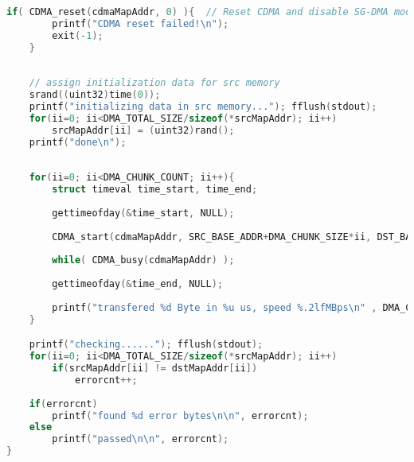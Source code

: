 \begin{lstlisting}[language=c, label=lst:sh, caption={Codice completo test CDMA}]
    if( CDMA_reset(cdmaMapAddr, 0) ){  // Reset CDMA and disable SG-DMA mode
        printf("CDMA reset failed!\n");
        exit(-1);
    }
    
    
    // assign initialization data for src memory
    srand((uint32)time(0));
    printf("initializing data in src memory..."); fflush(stdout);
    for(ii=0; ii<DMA_TOTAL_SIZE/sizeof(*srcMapAddr); ii++)
        srcMapAddr[ii] = (uint32)rand();
    printf("done\n");
    
    
    for(ii=0; ii<DMA_CHUNK_COUNT; ii++){
        struct timeval time_start, time_end; 
        
        gettimeofday(&time_start, NULL);
        
        CDMA_start(cdmaMapAddr, SRC_BASE_ADDR+DMA_CHUNK_SIZE*ii, DST_BASE_ADDR+DMA_CHUNK_SIZE*ii, DMA_CHUNK_SIZE);
        
        while( CDMA_busy(cdmaMapAddr) ); 
        
        gettimeofday(&time_end, NULL);
        
        printf("transfered %d Byte in %u us, speed %.2lfMBps\n" , DMA_CHUNK_SIZE, time_diff_us(time_start, time_end) , ((double)DMA_CHUNK_SIZE) / time_diff_us(time_start, time_end) );
    }

    printf("checking......"); fflush(stdout);
    for(ii=0; ii<DMA_TOTAL_SIZE/sizeof(*srcMapAddr); ii++)
        if(srcMapAddr[ii] != dstMapAddr[ii])
            errorcnt++;
    
    if(errorcnt)
        printf("found %d error bytes\n\n", errorcnt);
    else
        printf("passed\n\n", errorcnt);
}

\end{lstlisting}